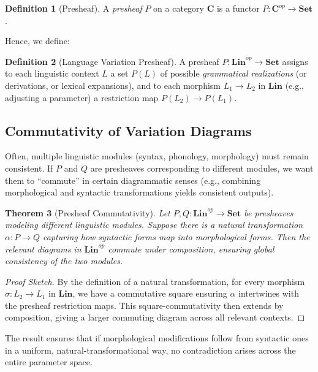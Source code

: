 \documentclass[12pt]{article}
\theoremstyle{plain}
\newtheorem{theorem}{Theorem}[section]
\theoremstyle{definition}
\newtheorem{definition}[theorem]{Definition}
\begin{document}
\begin{definition}[Presheaf]
A \emph{presheaf} \(P\) on a category \(\mathbf{C}\) is a functor \(P : \mathbf{C}^{op} \to \mathbf{Set}\).
\end{definition}

Hence, we define:

\begin{definition}[Language Variation Presheaf]
A presheaf \(P: \mathbf{Lin}^{op} \to \mathbf{Set}\) assigns to each linguistic context \(L\) a set \(P(L)\) of possible \emph{grammatical realizations} (or derivations, or lexical expansions), and to each morphism \(L_1 \to L_2\) in \(\mathbf{Lin}\) (e.g., adjusting a parameter) a restriction map \(P(L_2) \to P(L_1)\).
\end{definition}

\subsection{Commutativity of Variation Diagrams}
Often, multiple linguistic modules (syntax, phonology, morphology) must remain consistent. If \(P\) and \(Q\) are presheaves corresponding to different modules, we want them to “commute” in certain diagrammatic senses (e.g., combining morphological and syntactic transformations yields consistent outputs).

\begin{theorem}[Presheaf Commutativity]\label{thm:Comm}
Let \(P, Q: \mathbf{Lin}^{op} \to \mathbf{Set}\) be presheaves modeling different linguistic modules. Suppose there is a natural transformation \(\alpha: P \to Q\) capturing how syntactic forms map into morphological forms. Then the relevant diagrams in \(\mathbf{Lin}^{op}\) commute under composition, ensuring global consistency of the two modules.
\end{theorem}

\begin{proof}[Proof Sketch]
By the definition of a natural transformation, for every morphism \(\sigma: L_2 \to L_1\) in \(\mathbf{Lin}\), we have a commutative square ensuring \(\alpha\) intertwines with the presheaf restriction maps. This square-commutativity then extends by composition, giving a larger commuting diagram across all relevant contexts.
\end{proof}

The result ensures that if morphological modifications follow from syntactic ones in a uniform, natural-transformational way, no contradiction arises across the entire parameter space.
\end{document}
